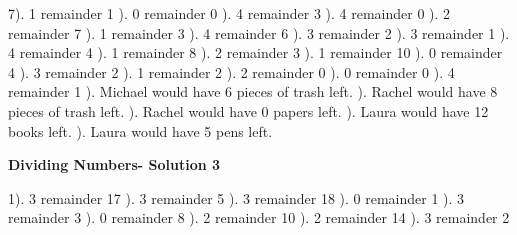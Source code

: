 \documentclass{article}%
\begin{document}
7). 1 remainder 1%
). 0 remainder 0%
). 4 remainder 3%
). 4 remainder 0%
). 2 remainder 7%
). 1 remainder 3%
). 4 remainder 6%
). 3 remainder 2%
). 3 remainder 1%
). 4 remainder 4%
). 1 remainder 8%
). 2 remainder 3%
). 1 remainder 10%
). 0 remainder 4%
). 3 remainder 2%
). 1 remainder 2%
). 2 remainder 0%
). 0 remainder 0%
). 4 remainder 1%
). Michael would have 6 pieces of trash left.%
). Rachel would have 8 pieces of trash left.%
). Rachel would have 0 papers left.%
). Laura would have 12 books left.%
). Laura would have 5 pens left.%
\newline%
\newpage%
\large%
\begin{center}%
\textbf{Dividing Numbers- Solution 3}%
\newline%
\end{center} \normalsize%
1). 3 remainder 17%
). 3 remainder 5%
). 3 remainder 18%
). 0 remainder 1%
). 3 remainder 3%
). 0 remainder 8%
). 2 remainder 10%
). 2 remainder 14%
). 3 remainder 2%
\newline%
\end{document}
